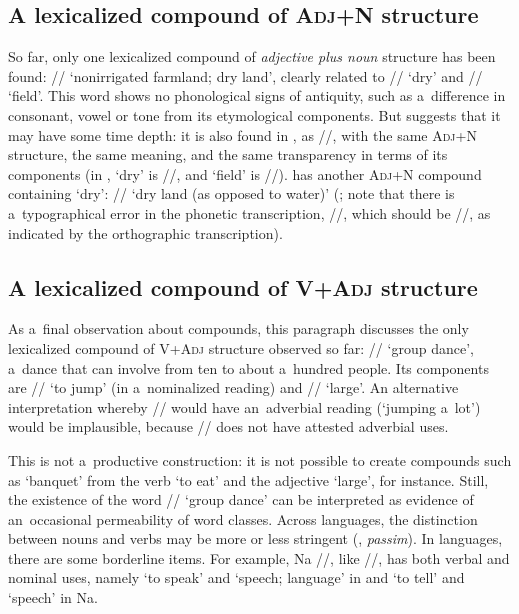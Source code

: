 \subsection{A lexicalized compound of \textsc{Adj}+N structure}
\label{sec:alexicalizedcompoundofadjnstructure}

So far, only one lexicalized compound of \textit{adjective plus noun} structure has been found: //
‘nonirrigated farmland; dry land’, clearly related to // ‘dry’ and //
‘field’. This word shows no phonological signs of antiquity, such as a~difference in consonant,
vowel or tone from its etymological components. But  suggests that it may have
some time depth: it is also found in , as //, with the same \textsc{Adj}+\textsc{N}
structure, the same meaning, and the same transparency in terms of its components (in , ‘dry’ is
//, and ‘field’ is //).  has another \textsc{Adj}+\textsc{N} compound
containing ‘dry’: // ‘dry land (as opposed to water)’ (\citealt[55]{pinsonetal2012}; note that there
is a~typographical error in the phonetic transcription, //, which should be //, as
indicated by the orthographic transcription).


\subsection{A lexicalized compound of V+\textsc{Adj} structure}
\label{sec:alexicalizedcompoundofvadjstructure}

As a~final observation about compounds, this paragraph discusses the only lexicalized compound of \textsc{V}+\textsc{Adj} structure observed so far: // ‘group dance’, a~dance that can involve from ten
to about a~hundred people. Its components are // ‘to jump’ (in a~nominalized reading)
and // ‘large’. An alternative interpretation whereby // would have an~{adverbial}
reading (‘jumping a~lot’) would be implausible, because // does not have attested
{adverbial} uses.

This is not a~productive construction: it is not possible to create compounds such as ‘banquet’ from
the verb ‘to eat’ and the adjective ‘large’, for instance. Still, the existence of the word // ‘group dance’ can be
interpreted as evidence of an~occasional permeability of word classes. Across languages, the
distinction between nouns and verbs may be more or less stringent (\citealt{launey1994}, \textit{passim}). In 
languages, there are some borderline items. For example, Na //,
like  //, has both verbal and nominal uses, namely ‘to speak’ and ‘speech; language’ in  and ‘to tell’ and ‘speech’ in Na.


